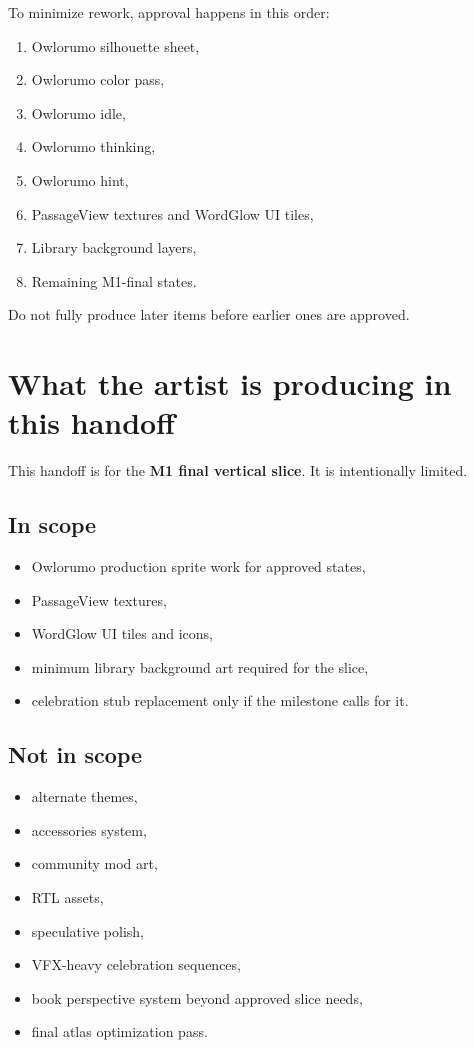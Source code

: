 \documentclass[11pt,a4paper]{article}
\begin{document}
To minimize rework, approval happens in this order:
\begin{enumerate}
  \item Owlorumo silhouette sheet,
  \item Owlorumo color pass,
  \item Owlorumo idle,
  \item Owlorumo thinking,
  \item Owlorumo hint,
  \item PassageView textures and WordGlow UI tiles,
  \item Library background layers,
  \item Remaining M1-final states.
\end{enumerate}

Do not fully produce later items before earlier ones are approved.

\section{What the artist is producing in this handoff}

This handoff is for the \textbf{M1 final vertical slice}. It is intentionally limited.

\subsection{In scope}
\begin{itemize}
  \item Owlorumo production sprite work for approved states,
  \item PassageView textures,
  \item WordGlow UI tiles and icons,
  \item minimum library background art required for the slice,
  \item celebration stub replacement only if the milestone calls for it.
\end{itemize}

\subsection{Not in scope}
\begin{itemize}
  \item alternate themes,
  \item accessories system,
  \item community mod art,
  \item RTL assets,
  \item speculative polish,
  \item VFX-heavy celebration sequences,
  \item book perspective system beyond approved slice needs,
  \item final atlas optimization pass.
\end{itemize}
\end{document}
